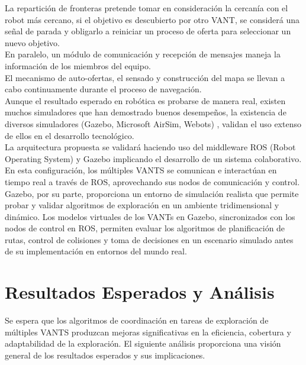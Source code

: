 \documentclass[sigconf]{acmart}
\begin{document}
La repartición de fronteras pretende tomar en consideración la cercanía con el robot más cercano, si el objetivo es descubierto por otro VANT, se considerá una señal de parada y obligarlo a reiniciar un proceso de oferta para seleccionar un nuevo objetivo.\\

En paralelo, un módulo de comunicación y recepción de mensajes maneja la información de los miembros del equipo.\\

El mecanismo de auto-ofertas, el sensado y construcción del mapa se llevan a cabo continuamente durante el proceso de navegación.\\

Aunque el resultado esperado en robótica es probarse de manera real, existen muchos simuladores que han demostrado buenos desempeños, la existencia de diversos simuladores (Gazebo, Microsoft AirSim, Webots) \cite{Chen2023}, validan el uso extenso de ellos en el desarrollo tecnológico.\\

La arquitectura propuesta se validará haciendo uso del middleware ROS (Robot Operating System) y Gazebo implicando el desarrollo de un sistema colaborativo. En esta configuración, los múltiples VANTS se comunican e interactúan en tiempo real a través de ROS, aprovechando sus nodos de comunicación y control. Gazebo, por su parte, proporciona un entorno de simulación realista que permite probar y validar algoritmos de exploración en un ambiente tridimensional y dinámico. Los modelos virtuales de los VANTs en Gazebo, sincronizados con los nodos de control en ROS, permiten evaluar los algoritmos de planificación de rutas, control de colisiones y toma de decisiones en un escenario simulado antes de su implementación en entornos del mundo real. %

\section{Resultados Esperados y Análisis}

Se espera que los algoritmos de coordinación en tareas de exploración de múltiples VANTS produzcan mejoras significativas en la eficiencia, cobertura y adaptabilidad de la exploración. El siguiente análisis proporciona una visión general de los resultados esperados y sus implicaciones.
\end{document}
